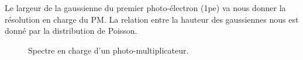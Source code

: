 Le largeur de la gaussienne du premier photo-électron (1pe) va nous donner la résolution en charge du PM. La relation entre la hauteur des gaussiennes nous est donné par la distribution de Poisson.

\begin{figure}[!h]
    \caption{\label{fig:spectre} Spectre en charge d'un photo-multiplicateur.}
\end{figure}

